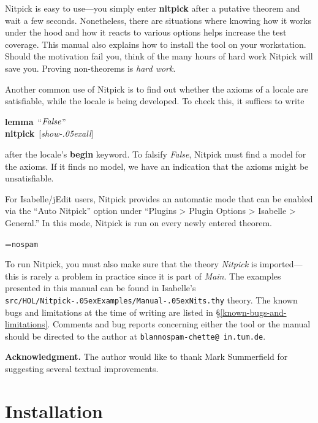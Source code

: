 \documentclass[a4paper,12pt]{article}
\renewcommand\_{\hbox{\textunderscore\kern-.05ex}}
\begin{document}
Nitpick is easy to use---you simply enter \textbf{nitpick} after a putative
theorem and wait a few seconds. Nonetheless, there are situations where knowing
how it works under the hood and how it reacts to various options helps
increase the test coverage. This manual also explains how to install the tool on
your workstation. Should the motivation fail you, think of the many hours of
hard work Nitpick will save you. Proving non-theorems is \textsl{hard work}.

Another common use of Nitpick is to find out whether the axioms of a locale are
satisfiable, while the locale is being developed. To check this, it suffices to
write

\prew
\textbf{lemma}~``$\textit{False\/}$'' \\
\textbf{nitpick}~[\textit{show\_all}]
\postw

after the locale's \textbf{begin} keyword. To falsify \textit{False}, Nitpick
must find a model for the axioms. If it finds no model, we have an indication
that the axioms might be unsatisfiable.

For Isabelle/jEdit users, Nitpick provides an automatic mode that can be enabled
via the ``Auto Nitpick'' option under ``Plugins > Plugin Options > Isabelle >
General.'' In this mode, Nitpick is run on every newly entered theorem.

\newbox\boxA
\setbox\boxA=\hbox{\texttt{nospam}}

\newcommand\authoremail{\texttt{blan{\color{white}nospam}\kern-\wd\boxA{}chette@\allowbreak
in.\allowbreak tum.\allowbreak de}}

To run Nitpick, you must also make sure that the theory \textit{Nitpick} is
imported---this is rarely a problem in practice since it is part of
\textit{Main}. The examples presented in this manual can be found
in Isabelle's \texttt{src/HOL/\allowbreak Nitpick\_\allowbreak Examples/\allowbreak Manual\_Nits.thy} theory.
The known bugs and limitations at the time of writing are listed in
\S\ref{known-bugs-and-limitations}. Comments and bug reports concerning either
the tool or the manual should be directed to the author at \authoremail.

\smallskipamount

\textbf{Acknowledgment.} The author would like to thank Mark Summerfield for
suggesting several textual improvements.

\section{Installation}
\label{installation}
\end{document}
